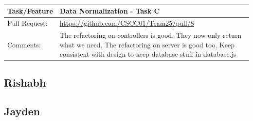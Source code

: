 \documentclass[12pt]{article}
\begin{document}
\begin{table}[H]
\begin{tabular}{|p{3cm}|p{11cm}|}
\hline
Task/Feature  & Data Normalization - Task C
 \\ \hline
Pull Request: & \url{https://github.com/CSCC01/Team25/pull/8}                                                                                                                                                                                                                                                                                                                      \\ \hline
Comments:     & The refactoring on controllers is good. They now only return what we need.
The refactoring on server is good too. Keep consistent with design to keep database stuff in database.js

 \\ \hline
\end{tabular}
\end{table}

\subsection{Rishabh}

\subsection{Jayden}


\newpage


\end{document}
